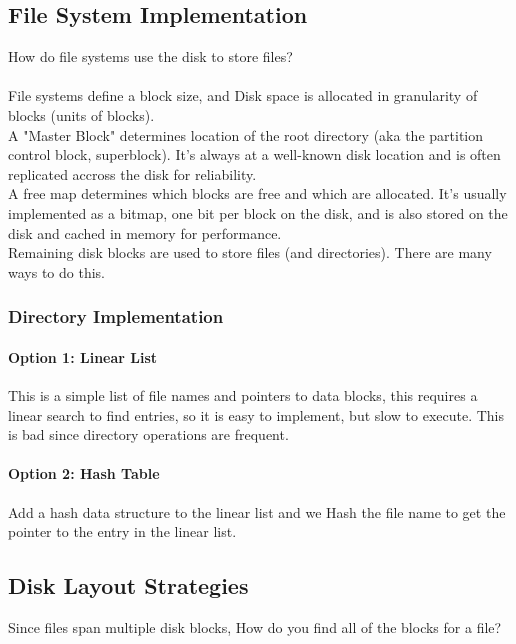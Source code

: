 \documentclass{article}
\begin{document}
\subsection{File System Implementation}

How do file systems use the disk to store files?\\
\\
File systems define a block size, and Disk space is allocated in granularity of blocks (units of blocks).
\\
A "Master Block" determines location of the root directory (aka the partition control block, superblock). It's always at a well-known disk location and is often replicated accross the disk for reliability.
\\
A free map determines which blocks are free and which are allocated. It's usually implemented as a bitmap, one bit per block on the disk, and is also stored on the disk and cached in memory for performance.
\\
Remaining disk blocks are used to store files (and directories). There are many ways to do this.

\subsubsection{Directory Implementation}

\paragraph{Option 1: Linear List} This is a simple list of file names and pointers to data blocks, this requires a linear search to find entries, so it is easy to implement, but slow to execute. This is bad since directory operations are frequent.

\paragraph{Option 2: Hash Table}

Add a hash data structure to the linear list and we Hash the file name to get the pointer to the entry in the linear list.

\subsection{Disk Layout Strategies}

Since files span multiple disk blocks, How do you find all of the blocks for a file?
\end{document}
